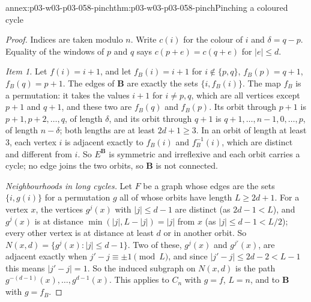 \begin{annexitem}{annex:p03-w03-p03-058-pinch}{thm:p03-w03-p03-058-pinch}{Pinching a coloured cycle}
\begin{proof}
Indices are taken modulo \(n\). Write \(c(i)\) for the colour of \(i\) and
\(\delta=q-p\). Equality of the windows of \(p\) and \(q\) says
\(c(p+e)=c(q+e)\) for \(|e|\le d\).

\emph{Item 1.} Let \(f(i)=i+1\), and let \(f_B(i)=i+1\) for
\(i\notin\{p,q\}\), \(f_B(p)=q+1\), \(f_B(q)=p+1\). The edges of
\(\mathbf B\) are exactly the sets \(\{i,f_B(i)\}\). The map \(f_B\) is a
permutation: it takes the values \(i+1\) for \(i\ne p,q\), which are all
vertices except \(p+1\) and \(q+1\), and these two are \(f_B(q)\) and
\(f_B(p)\). Its orbit through \(p+1\) is \(p+1,p+2,\ldots,q\), of length
\(\delta\), and its orbit through \(q+1\) is \(q+1,\ldots,n-1,0,\ldots,p\),
of length \(n-\delta\); both lengths are at least \(2d+1\ge3\). In an orbit
of length at least \(3\), each vertex \(i\) is adjacent exactly to
\(f_B(i)\) and \(f_B^{-1}(i)\), which are distinct and different from
\(i\). So \(E^{\mathbf B}\) is symmetric and irreflexive and each orbit
carries a cycle; no edge joins the two orbits, so \(\mathbf B\) is not
connected.

\emph{Neighbourhoods in long cycles.} Let \(F\) be a graph whose edges are
the sets \(\{i,g(i)\}\) for a permutation \(g\) all of whose orbits have
length \(L\ge2d+1\). For a vertex \(x\), the vertices \(g^j(x)\) with
\(|j|\le d-1\) are distinct (as \(2d-1<L\)), and \(g^j(x)\) is at distance
\(\min(|j|,L-|j|)=|j|\) from \(x\) (as \(|j|\le d-1<L/2\)); every other
vertex is at distance at least \(d\) or in another orbit. So
\(N(x,d)=\{g^j(x):|j|\le d-1\}\). Two of these, \(g^j(x)\) and
\(g^{j'}(x)\), are adjacent exactly when \(j'-j\equiv\pm1\pmod L\), and
since \(|j'-j|\le2d-2<L-1\) this means \(|j'-j|=1\). So the induced subgraph
on \(N(x,d)\) is the path \(g^{-(d-1)}(x),\ldots,g^{d-1}(x)\). This applies
to \(C_n\) with \(g=f\), \(L=n\), and to \(\mathbf B\) with \(g=f_B\).


\end{proof}
\end{annexitem}

